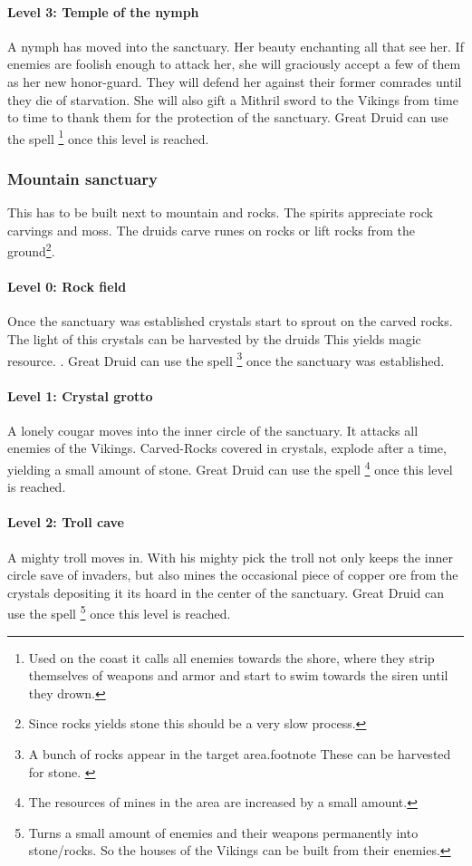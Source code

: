 \paragraph{Level 3: Temple of the nymph}
A nymph has moved into the sanctuary. Her beauty enchanting all that see her.
If enemies are foolish enough to attack her, she will graciously accept a few
of them as her new honor-guard. They will defend her against their former
comrades until they die of starvation. She will also gift a Mithril sword to
the \gls{Vikings} from time to time to thank them for the protection of the
sanctuary. Great Druid can use the spell \footnote{ Used
	on the coast it calls all enemies towards the shore, where they strip
	themselves of weapons and armor and start to swim towards the siren until they
	drown. } once this level is reached.

\subsubsection{Mountain sanctuary}
This has to be built next to mountain and rocks. The spirits appreciate rock
carvings and moss. The druids carve runes on rocks or lift rocks from the
ground\footnote{ Since rocks yields stone this should be a very slow process.
}.

\paragraph{Level 0: Rock field}
Once the sanctuary was established crystals start to sprout on the carved
rocks. The light of this crystals can be harvested by the druids{ This yields
		magic resource. }. Great Druid can use the spell \footnote{ A bunch of rocks appear in the target area.footnote{ These can
			be harvested for stone. } } once the sanctuary was established.

\paragraph{Level 1: Crystal grotto}
A lonely cougar moves into the inner circle of the sanctuary. It attacks all
enemies of the \gls{Vikings}. Carved-Rocks covered in crystals, explode after a
time, yielding a small amount of stone. Great Druid can use the spell
\footnote{ The resources of mines in the
	area are increased by a small amount. } once this level is reached.

\paragraph{Level 2: Troll cave}
A mighty troll moves in. With his mighty pick the troll not only keeps the
inner circle save of invaders, but also mines the occasional piece of copper
ore from the crystals depositing it its hoard in the center of the sanctuary.
Great Druid can use the spell \footnote{ Turns a
	small amount of enemies and their weapons permanently into stone/rocks. So the
	houses of the \gls{Vikings} can be built from their enemies. } once this level
is reached.

